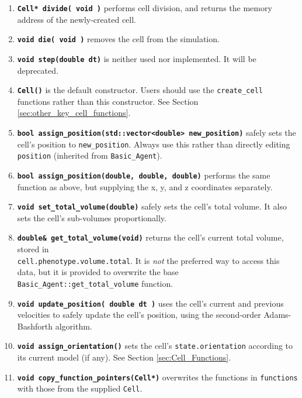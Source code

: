 \documentclass[12pt]{article}
\renewcommand{\v}{\verb}
\newcommand{\smallcode}[1]{\textbf{\texttt{#1}}}
\begin{document}
\begin{enumerate}
\item 
\smallcode{Cell* divide( void )} performs cell division, and returns 
the memory address of the newly-created cell. 

\item 
\smallcode{void die( void )} removes the cell from the simulation. 

\item 
\smallcode{void step(double dt)} is neither used nor implemented. It will 
be deprecated. 

\item 
\smallcode{Cell()} is the default constructor. Users should 
use the \v|create_cell| functions rather than this constructor. 
See Section \ref{sec:other_key_cell_functions}. 

\item 
\smallcode{bool assign\_position(std::vector<double> new\_position)} 
safely sets the cell's position to 
\v|new_position|. Always use this rather than directly editing 
\v|position| (inherited from \v|Basic_Agent|).

\item 
\smallcode{bool assign\_position(double, double, double)} performs 
the same function as above, but supplying the x, y, and z coordinates 
separately. 

\item 
\smallcode{void set\_total\_volume(double)} safely sets the cell's total volume. 
It also sets the cell's sub-volumes proportionally. 

\item 
\smallcode{double\& get\_total\_volume(void)} returns the cell's 
current total volume, stored in \\
\v|cell.phenotype.volume.total|. It is 
\emph{not} the preferred way to access this data, but it is provided to 
overwrite the base \v|Basic_Agent::get_total_volume| function. 

\item 
\smallcode{void update\_position( double dt )} uses the cell's current 
and previous velocities to safely update the cell's position, using 
the second-order Adams-Bashforth algorithm. 

\item 
\smallcode{void assign\_orientation()} sets the cell's 
\v|state.orientation| according to its current model (if any). 
See Section \ref{sec:Cell_Functions}.  

\item 
\smallcode{void copy\_function\_pointers(Cell*)} overwrites 
the functions in \v|functions| with those from the 
supplied \v|Cell|. 


\end{enumerate}
\end{document}
